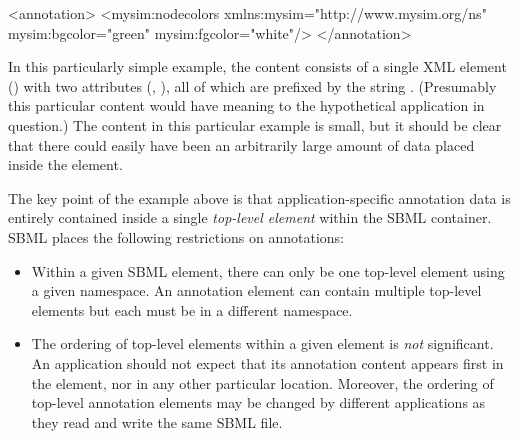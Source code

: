 \begin{example}
<annotation>
    <mysim:nodecolors xmlns:mysim="http://www.mysim.org/ns"
         mysim:bgcolor="green" mysim:fgcolor="white"/>
</annotation>
\end{example}

In this particularly simple example, the content consists of a single
XML element () with two attributes
(, ), all of which are prefixed by
the string .  (Presumably this particular content
would have meaning to the hypothetical application in question.)
The content in this particular example is small, but it should be
clear that there could easily have been an arbitrarily large
amount of data placed inside the  element.

The key point of the example above is that application-specific
annotation data is entirely contained inside a single
\emph{top-level element} within the SBML 
container.  SBML \thisLVnum places the following
restrictions on annotations:
\begin{itemize}

\item Within a given SBML  element, there can
  only be one top-level element using a given namespace.  An
  annotation element can contain multiple top-level elements but
  each must be in a different namespace.

  
\item The ordering of top-level elements within a given
   element is \emph{not} significant.  An
  application should not expect that its annotation content
  appears first in the  element, nor in any
  other particular location.  Moreover, the ordering of
    top-level annotation elements may be changed by
  different applications as they read and write the same
    SBML file.

\end{itemize}

